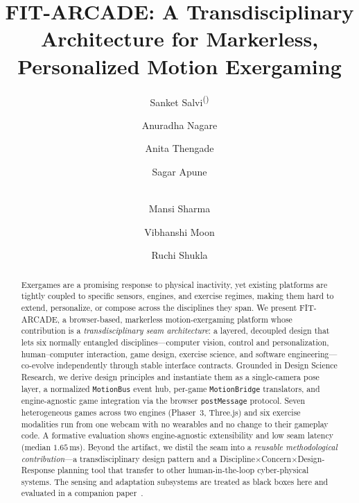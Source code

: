 \documentclass[runningheads]{llncs}
\newcommand{\sys}{\textsc{FIT-ARCADE}}
\newcommand{\motionbus}{\texttt{MotionBus}}
\newcommand{\motionbridge}{\texttt{MotionBridge}}
\newcommand{\postmsg}{\texttt{postMessage}}
\newcommand{\citecompanion}{\cite{companion2026}}
\begin{document}
\title{FIT-ARCADE: A Transdisciplinary Architecture for Markerless, Personalized Motion Exergaming}

\author{%
  Sanket Salvi\textsuperscript{(\Letter)} \and
  Anuradha Nagare \and
  Anita Thengade \and
  Sagar Apune \and \\
  Mansi Sharma \and
  Vibhanshi Moon \and
  Ruchi Shukla%
}

\maketitle

\begin{abstract}
Exergames are a promising response to physical inactivity, yet existing platforms
are tightly coupled to specific sensors, engines, and exercise regimes, making them
hard to extend, personalize, or compose across the disciplines they span. We present
\sys{}, a browser-based, markerless motion-exergaming platform whose contribution is
a \emph{transdisciplinary seam architecture}: a layered, decoupled design that lets
six normally entangled disciplines---computer vision, control and personalization,
human--computer interaction, game design, exercise science, and software
engineering---co-evolve independently through stable interface contracts. Grounded in
Design Science Research, we derive design principles and instantiate them as a
single-camera pose layer, a normalized \motionbus{} event hub, per-game
\motionbridge{} translators, and engine-agnostic game integration via the browser
\postmsg{} protocol. Seven heterogeneous games across two engines (Phaser~3,
Three.js) and six exercise modalities run from one webcam with no wearables and no
change to their gameplay code. A formative evaluation shows engine-agnostic
extensibility and low seam latency (median $1.65$\,ms). Beyond the artifact, we distil
the seam into a \emph{reusable methodological contribution}---a transdisciplinary design
pattern and a Discipline$\times$Concern$\times$Design-Response planning tool that transfer
to other human-in-the-loop cyber-physical systems. The sensing and adaptation
subsystems are treated as black boxes here and evaluated in a companion
paper~\citecompanion{}.
\end{abstract}
\end{document}
